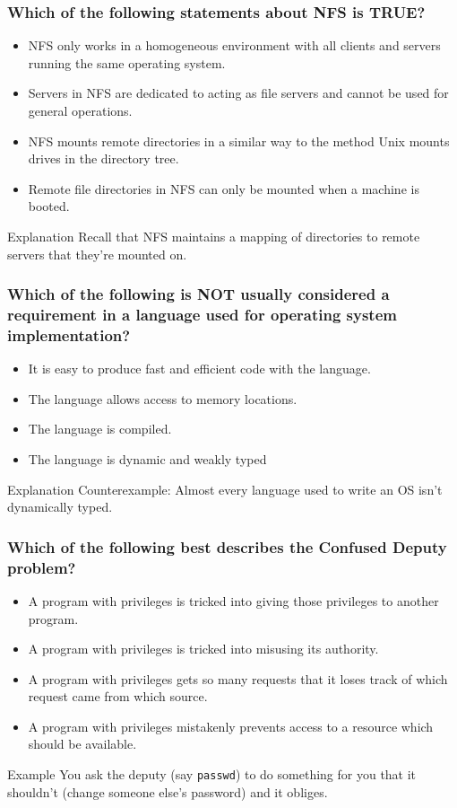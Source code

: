\documentclass{beamer}
\begin{document}
\begin{frame}
  \frametitle{Which of the following statements about NFS is TRUE?}
  \begin{itemize}
    \item NFS only works in a homogeneous environment with all clients and servers running the same operating system.
    \item Servers in NFS are dedicated to acting as file servers and cannot be used for general operations.
    \item<alert@2> NFS mounts remote directories in a similar way to the method Unix mounts drives in the directory tree.
    \item Remote file directories in NFS can only be mounted when a machine is booted.
  \end{itemize}
  \pause
  \begin{block}{Explanation}
    Recall that NFS maintains a mapping of directories to remote servers that they're mounted on.
  \end{block}
\end{frame}
\begin{frame}
  \frametitle{Which of the following is NOT usually considered a requirement in a language used for operating system implementation?}
  \begin{itemize}
    \item It is easy to produce fast and efficient code with the language.
    \item The language allows access to memory locations.
    \item The language is compiled.
    \item<alert@2> The language is dynamic and weakly typed
  \end{itemize}
  \pause
  \begin{block}{Explanation}
    Counterexample: Almost every language used to write an OS isn't dynamically typed.
  \end{block}
\end{frame}
\begin{frame}
  \frametitle{Which of the following best describes the Confused Deputy problem?}
  \begin{itemize}
    \item<alert@2> A program with privileges is tricked into giving those privileges to another program.
    \item A program with privileges is tricked into misusing its authority.
    \item A program with privileges gets so many requests that it loses track of which request came from which source.
    \item A program with privileges mistakenly prevents access to a resource which should be available. 
  \end{itemize}
  \pause
  \begin{block}{Example}
    You ask the deputy (say \texttt{passwd}) to do something for you that it shouldn't (change someone else's password) and it obliges.
  \end{block}
\end{frame}
\end{document}
